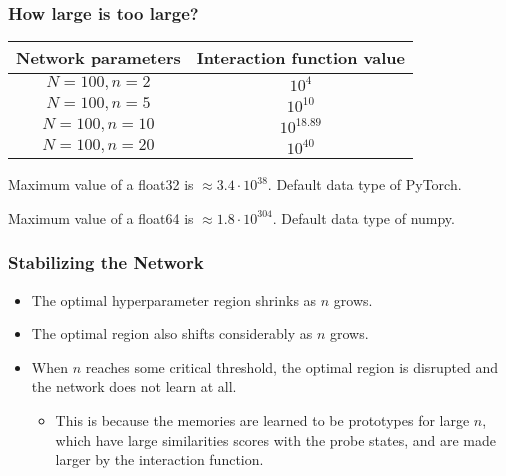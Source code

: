\begin{frame}
    \frametitle{How large is too large?}

    \begin{center}
        \begin{tabular}{| c | c |}
            \hline
            Network parameters & Interaction function value \\
            \hline
            \hline
            \(N=100, n=2\) & \(10^{4}\) \\
            \hline
            \(N=100, n=5\) & \(10^{10}\) \\
            \hline
            \(N=100, n=10\) & \(10^{18.89}\) \\
            \hline
            \(N=100, n=20\) & \(10^{40}\) \\
            \hline
        \end{tabular}
    \end{center}

    \pause
    Maximum value of a float32 is \(\approx 3.4 \cdot 10^{38}\). Default data type of PyTorch.

    \pause
    Maximum value of a float64 is \(\approx 1.8 \cdot 10^{304}\). Default data type of numpy.
\end{frame}

\begin{frame}
    \frametitle{Stabilizing the Network}
    
    \begin{itemize}
        \item The optimal hyperparameter region shrinks as \(n\) grows.
        \pause
        \item The optimal region also shifts considerably as \(n\) grows.
        \pause
        \item When \(n\) reaches some critical threshold, the optimal region is disrupted and the network does not learn at all.
        \pause
        \begin{itemize}
            \item This is because the memories are learned to be prototypes for large \(n\), which have large similarities scores with the probe states, and are made larger by the interaction function.
        \end{itemize}
    \end{itemize}    
\end{frame}
    


